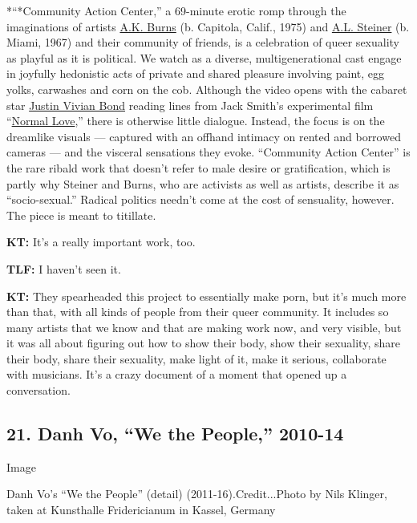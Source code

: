 *``*Community Action Center,'' a 69-minute erotic romp through the
imaginations of artists \href{http://www.akburns.net/}{A.K. Burns} (b.
Capitola, Calif., 1975) and
\href{https://www.hellomynameissteiner.com/}{A.L. Steiner} (b. Miami,
1967) and their community of friends, is a celebration of queer
sexuality as playful as it is political. We watch as a diverse,
multigenerational cast engage in joyfully hedonistic acts of private and
shared pleasure involving paint, egg yolks, carwashes and corn on the
cob. Although the video opens with the cabaret star
\href{https://www.nytimes.com/2016/05/06/t-magazine/entertainment/my-10-favorite-books-justin-vivian-bond.html}{Justin
Vivian Bond} reading lines from Jack Smith's experimental film
``\href{https://www.moma.org/calendar/exhibitions/3754?locale=en}{Normal
Love},'' there is otherwise little dialogue. Instead, the focus is on
the dreamlike visuals --- captured with an offhand intimacy on rented
and borrowed cameras --- and the visceral sensations they evoke.
``Community Action Center'' is the rare ribald work that doesn't refer
to male desire or gratification, which is partly why Steiner and Burns,
who are activists as well as artists, describe it as ``socio-sexual.''
Radical politics needn't come at the cost of sensuality, however. The
piece is meant to titillate.

\textbf{KT:} It's a really important work, too.

\textbf{TLF:} I haven't seen it.

\textbf{KT:} They spearheaded this project to essentially make porn, but
it's much more than that, with all kinds of people from their queer
community. It includes so many artists that we know and that are making
work now, and very visible, but it was all about figuring out how to
show their body, show their sexuality, share their body, share their
sexuality, make light of it, make it serious, collaborate with
musicians. It's a crazy document of a moment that opened up a
conversation.

\hypertarget{21-danh-vo-we-the-people-2010-14}{%
\subsection{21. Danh Vo, ``We the People,''
2010-14}\label{21-danh-vo-we-the-people-2010-14}}

Image

Danh Vo's ``We the People'' (detail) (2011-16).Credit...Photo by Nils
Klinger, taken at Kunsthalle Fridericianum in Kassel, Germany

